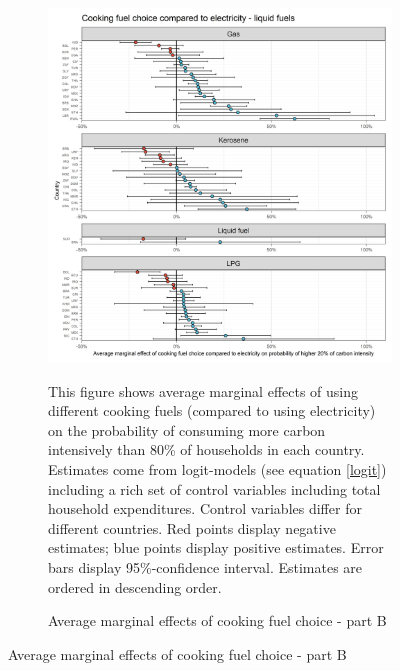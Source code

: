  \begin{figure}[ht!]\ContinuedFloat
   \centering
   \begin{subfigure}[b]{\textwidth}
   \centering
   \caption{Average marginal effects of cooking fuel choice - part B} \label{fig:Logit_ME_CF_2}
   \includegraphics{1_Figures/Analysis_Logit_Models_Marginal_Effects/Average_Marginal_Effects_affected_upper_80_CF_Electricity B_2017.jpg}
   \begin{subcaption2}
     This figure shows average marginal effects of using different cooking fuels (compared to using electricity) on the probability of consuming more carbon intensively than 80\% of households in each country. Estimates come from logit-models (see equation \ref{logit}) including a rich set of control variables including total household expenditures. Control variables differ for different countries. Red points display negative estimates; blue points display positive estimates. Error bars display 95\%-confidence interval. Estimates are ordered in descending order.
   \end{subcaption2}
   \end{subfigure}
 \end{figure}
 \clearpage

